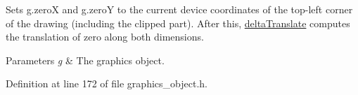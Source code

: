 Sets {\ttfamily g.\+zeroX} and {\ttfamily g.\+zeroY} to the current device coordinates of the top-\/left corner of the drawing (including the clipped part). After this, \hyperlink{namespaceslb_1_1core_1_1ui_ac32e15bebf42bd64ce1dd79b29fd4060}{delta\+Translate} computes the translation of zero along both dimensions. 


\begin{DoxyParams}{Parameters}
{\em g} & The graphics object. \\
\hline
\end{DoxyParams}


Definition at line 172 of file graphics\+\_\+object.\+h.

